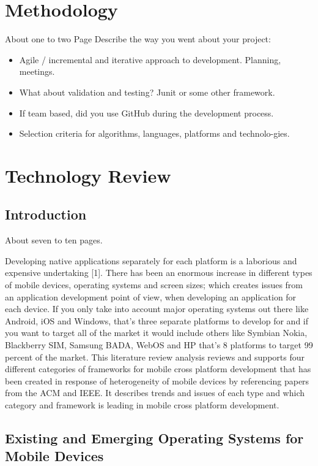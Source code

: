 \chapter{Methodology}
About one to two Page
Describe the way you went about your project:
\begin{itemize}
\item Agile / incremental and iterative approach to development. Planning, meetings.
\item What about validation and testing? Junit or some other framework.
\item If team based, did you use GitHub during the development process.
\item Selection criteria for algorithms, languages, platforms and technolo-gies.
\end{itemize}



\chapter{Technology Review}
\section{Introduction}
About seven to ten pages.


Developing native applications separately for each platform is a laborious
and expensive undertaking [1]. There has been an enormous increase in
different types of mobile devices, operating systems and screen sizes; which
creates issues from an application development point of view, when
developing an application for each device. If you only take into account major
operating systems out there like Android, iOS and Windows, that’s three
separate platforms to develop for and if you want to target all of the market
it would include others like Symbian Nokia, Blackberry SIM, Samsung BADA,
WebOS and HP that’s 8 platforms to target 99 percent of the market. This
literature review analysis reviews and supports four different categories of
frameworks for mobile cross platform development that has been created in
response of heterogeneity of mobile devices by referencing papers from the
ACM and IEEE. It describes trends and issues of each type and which category
and framework is leading in mobile cross platform development.

\section{Existing and Emerging Operating Systems for Mobile Devices}


